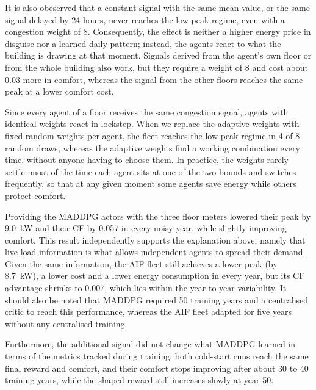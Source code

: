 \documentclass[conference]{IEEEtran}
\begin{document}
It is also obeserved that a constant signal with the same mean value,
or the same signal delayed by 24 hours, never reaches the low-peak regime, even
with a congestion weight of 8. Consequently, the effect is neither a higher
energy price in disguise nor a learned daily pattern; instead, the agents react
to what the building is drawing at that moment. Signals derived from the
agent's own floor or from the whole building also work, but they require a
weight of 8 and cost about 0.03 more in comfort, whereas the signal from the
other floors reaches the same peak at a lower comfort cost.

Since every agent of a floor
receives the same congestion signal, agents with identical weights react in
lockstep. When we replace the adaptive weights with fixed random weights per
agent, the fleet reaches the low-peak regime in 4 of 8 random draws, whereas
the adaptive weights find a working combination every time, without anyone
having to choose them. In practice, the weights rarely settle: most of the time
each agent sits at one of the two bounds and switches frequently, so that at any
given moment some agents save energy while others protect comfort.

Providing the
MADDPG actors with the three floor meters lowered their peak by
\SI{9.0}{\kilo\watt} and their CF by 0.057 in every noisy year, while slightly
improving comfort. This result independently supports the explanation above,
namely that live load information is what allows independent agents to spread
their demand. Given the same information, the AIF fleet still achieves a lower
peak (by \SI{8.7}{\kilo\watt}), a lower cost and a lower energy consumption in
every year, but its CF advantage shrinks to 0.007, which lies within the
year-to-year variability. It should also be noted that MADDPG required 50
training years and a centralised critic to reach this performance, whereas the
AIF fleet adapted for five years without any centralised training.

Furthermore, the additional signal did not change what MADDPG learned in terms
of the metrics tracked during training: both cold-start runs reach the same
final reward and comfort, and their comfort stops improving after about 30 to
40 training years, while the shaped reward still increases slowly at year 50.

\end{document}
